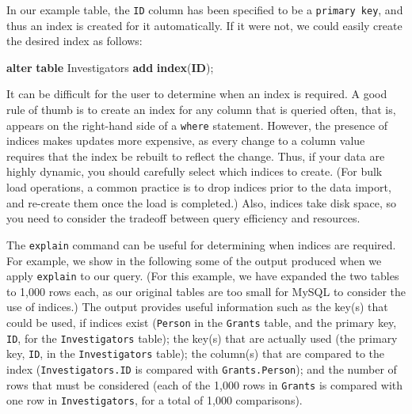 \documentclass[]{krantz}
\newenvironment{Shaded}{\begin{snugshade}}{\end{snugshade}}
\newcommand{\KeywordTok}[1]{\textcolor[rgb]{0.13,0.29,0.53}{\textbf{#1}}}
\newcommand{\NormalTok}[1]{#1}
\begin{document}
In our example table, the \texttt{ID} column has been specified to be a
\texttt{primary\ key}, and thus an index is created for it
automatically. If it were not, we could easily create the desired index
as follows:

\begin{Shaded}
\begin{Highlighting}[]
\KeywordTok{alter} \KeywordTok{table}\NormalTok{ Investigators }\KeywordTok{add} \KeywordTok{index}\NormalTok{(}\KeywordTok{ID}\NormalTok{);}
\end{Highlighting}
\end{Shaded}

It can be difficult for the user to determine when an index is required.
A good rule of thumb is to create an index for any column that is
queried often, that is, appears on the right-hand side of a
\texttt{where} statement. However, the presence of indices makes updates
more expensive, as every change to a column value requires that the
index be rebuilt to reflect the change. Thus, if your data are highly
dynamic, you should carefully select which indices to create. (For bulk
load operations, a common practice is to drop indices prior to the data
import, and re-create them once the load is completed.) Also, indices
take disk space, so you need to consider the tradeoff between query
efficiency and resources.

The \texttt{explain} command can be useful for determining when indices
are required. For example, we show in the following some of the output
produced when we apply \texttt{explain} to our query. (For this example,
we have expanded the two tables to 1,000 rows each, as our original
tables are too small for MySQL to consider the use of indices.) The
output provides useful information such as the key(s) that could be
used, if indices exist (\texttt{Person} in the \texttt{Grants} table,
and the primary key, \texttt{ID}, for the \texttt{Investigators} table);
the key(s) that are actually used (the primary key, \texttt{ID}, in the
\texttt{Investigators} table); the column(s) that are compared to the
index (\texttt{Investigators.ID} is compared with
\texttt{Grants.Person}); and the number of rows that must be considered
(each of the 1,000 rows in \texttt{Grants} is compared with one row in
\texttt{Investigators}, for a total of 1,000 comparisons).
\end{document}
